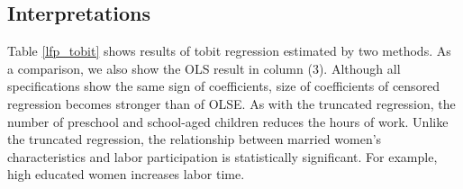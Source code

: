 \documentclass[
  12pt,
]{article}
\begin{document}
\hypertarget{interpretations-1}{%
\subsection{Interpretations}\label{interpretations-1}}

Table \ref{lfp_tobit} shows results of tobit regression estimated by two
methods. As a comparison, we also show the OLS result in column (3).
Although all specifications show the same sign of coefficients, size of
coefficients of censored regression becomes stronger than of OLSE. As
with the truncated regression, the number of preschool and school-aged
children reduces the hours of work. Unlike the truncated regression, the
relationship between married women's characteristics and labor
participation is statistically significant. For example, high educated
women increases labor time.
\end{document}

